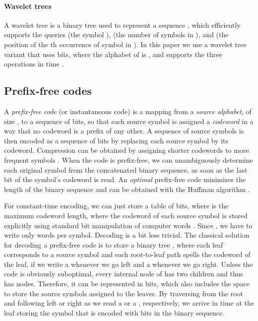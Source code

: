 \documentclass[preprint,12pt]{elsarticle}
\begin{document}
\paragraph{Wavelet trees}
A wavelet tree \cite{GGV03} is a binary tree used to represent a sequence
, which efficiently supports the queries  (the symbol
),  (the number of symbols  in ), and 
 (the position of the th occurrence of symbol  in ).
In this paper we use a wavelet tree variant \cite{BN12} that
uses  bits, where the alphabet of  is
, and supports the three operations in time 
.


\subsection{Prefix-free codes}
\label{sec:prefix}

A {\em prefix-free code} (or instantaneous code) is a mapping from a {\em 
source alphabet}, of size , to a sequence of bits, so that each source 
symbol is assigned a {\em codeword} in a way that no codeword is a prefix of 
any other. A sequence of source symbols is then encoded as a sequence of bits 
by replacing each source symbol by its codeword. Compression can be obtained 
by assigning shorter codewords to more frequent symbols \cite[Ch.\ 5]{CT06}.
When the code is prefix-free, we can unambiguously determine each original 
symbol from the concatenated binary sequence, as soon as the last bit of the
symbol's codeword is read. An {\em optimal} prefix-free code minimizes the 
length of the binary sequence and can be obtained with the Huffman algorithm 
\cite{Huf52}.

For constant-time encoding, we can just store a table of  bits, where 
 is the maximum codeword length, where the codeword of each source symbol is
stored explicitly using standard bit manipulation of computer words
\cite[Sec.\ 3.1]{Nav16}. Since , we have to write only 
words per symbol. Decoding is a bit less trivial. The classical solution for
decoding a prefix-free code is to store a binary tree , where each leaf 
corresponds to a source symbol and each root-to-leaf path spells the codeword 
of the leaf, if we write a  whenever we go left and a  whenever we go 
right. Unless the code is obviously suboptimal, every internal node of  has
two children and thus  has  nodes. Therefore, it can be 
represented in  bits, which also includes the space to 
store the source symbols assigned to the leaves. By traversing  from the 
root and following left or right as we read a  or a , respectively, we 
arrive in  time at the leaf storing the symbol that is encoded with 
 bits in the binary sequence. 
\end{document}

